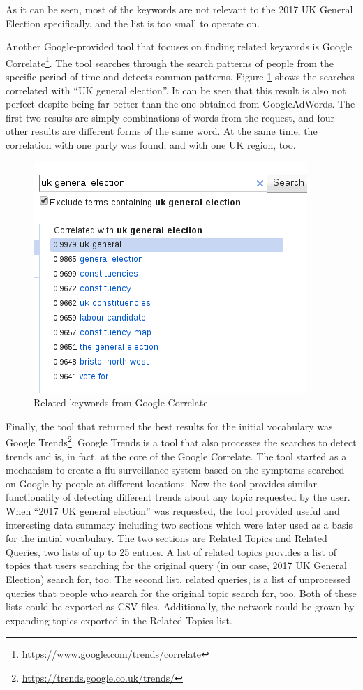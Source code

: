As it can be seen, most of the keywords are not relevant to the 2017 UK General Election specifically, and the list is too small to operate on.

Another Google-provided tool that focuses on finding related keywords is Google Correlate\footnote{\url{https://www.google.com/trends/correlate}}. The tool searches through the search patterns of people from the specific period of time and detects common patterns. Figure \ref{fig:googlecorrelation} shows the searches correlated with ``UK general election''. It can be seen that this result is also not perfect despite being far better than the one obtained from GoogleAdWords. The first two results are simply combinations of words from the request, and four other results are different forms of the same word. At the same time, the correlation with one party was found, and with one UK region, too.

\begin{figure}[ht]
\includegraphics[]{googlecorrelation}
\caption{Related keywords from Google Correlate}
\label{fig:googlecorrelation}
\end{figure}

Finally, the tool that returned the best results for the initial vocabulary was Google Trends\footnote{\url{https://trends.google.co.uk/trends/}}. Google Trends is a tool that also processes the searches to detect trends and is, in fact, at the core of the Google Correlate. The tool started as a mechanism to create a flu surveillance system based on the symptoms searched on Google by people at different locations. Now the tool provides similar functionality of detecting different trends about any topic requested by the user. When ``2017 UK general election'' was requested, the tool provided useful and interesting data summary including two sections which were later used as a basis for the initial vocabulary. The two sections are Related Topics and Related Queries, two lists of up to 25 entries. A list of related topics provides a list of topics that users searching for the original query (in our case, 2017 UK General Election) search for, too. The second list, related queries, is a list of unprocessed queries that people who search for the original topic search for, too. Both of these lists could be exported as CSV files. Additionally, the network could be grown by expanding topics exported in the Related Topics list.

